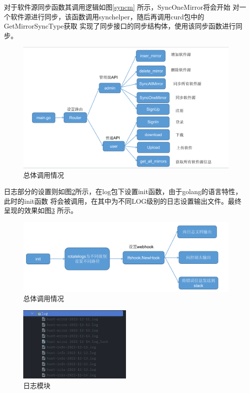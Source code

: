 \documentclass[supercite]{Experimental_Report}
\theoremstyle{definition}
\begin{document}
对于软件源同步函数其调用逻辑如图\ref{syncm} 所示，SyncOneMirror将会开始
对一个软件源进行同步，该函数调用synchelper，随后再调用curd包中的GetMirrorSyncType获取
实现了同步接口的同步结构体，使用该同步函数进行同步。

\begin{figure}[!h]
    \centering
    \includegraphics[width=1\textwidth]{./images/func.png}
    \caption{总体调用情况}
    \label{main}
\end{figure}
\newpage
日志部分的设置则如图\ref{log}所示，在log包下设置init函数，由于golang的语言特性，此时的init函数
将会被调用，在其中为不同LOG级别的日志设置输出文件。最终呈现的效果如图\ref{logrus} 所示。
\begin{figure}[!h]
    \centering
    \includegraphics[width=1\textwidth]{./images/log.png}
    \caption{总体调用情况}
    \label{log}
\end{figure}

\begin{figure}[!h]
    \centering
    \includegraphics[width=0.5\textwidth]{./images/logrus.png}
    \caption{日志模块}
    \label{logrus}
\end{figure}
\end{document}
